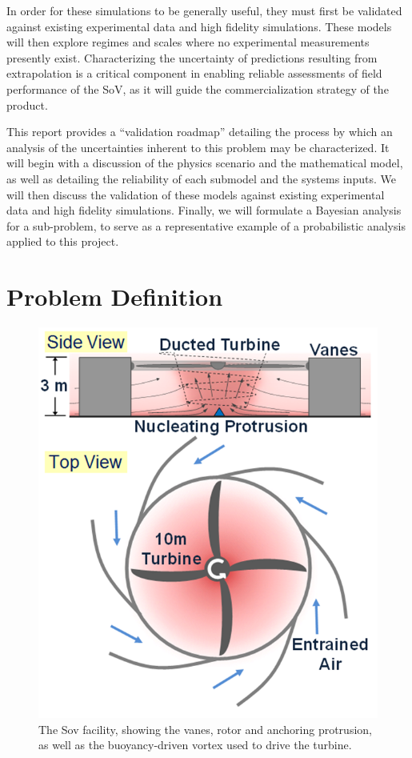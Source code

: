 \documentclass{article}
\begin{document}
In order for these simulations to be generally useful, they must first
be validated against existing experimental data and high fidelity
simulations. These models will then explore regimes and scales where no
experimental measurements presently exist. Characterizing the
uncertainty of predictions resulting from extrapolation is a critical
component in enabling reliable assessments of field performance of the
SoV, as it will guide the commercialization strategy of the product. 

This report provides a ``validation roadmap'' detailing the process by
which an analysis of the uncertainties inherent to this
problem may be characterized.  It will begin with a discussion of the
physics scenario and the mathematical model, as well as detailing the
reliability of each submodel and the systems inputs. We will then
discuss the validation of these models against existing experimental
data and high fidelity simulations. Finally, we will formulate a Bayesian
analysis for a sub-problem, to serve as a representative example of a
probabilistic analysis applied to this project.  

%
%
%
\section{Problem Definition}

\begin{figure}[h]
 \begin{center}
  \includegraphics[width=.5\linewidth]{figs/power_generation.png}
   \caption{The Sov facility, showing the vanes, rotor and anchoring
   protrusion, as well as the buoyancy-driven vortex used to drive the
   turbine.}
   \label{facility}
  \end{center}
\end{figure}
\end{document}
